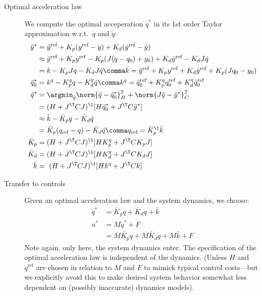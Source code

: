 \documentclass[10pt,fleqn,twoside]{article}
\newcommand{\rf}{{\text{ref}}}
\begin{document}
{{\begin{description}
\item[Optimal acceleration law] We compute the optimal acceperation
  $\ddot q^*$ in its 1st order Taylor approximation w.r.t.\ $q$ and
  $\dot q$:
\begin{align}
\ddot y^*
 &= \ddot y^\rf + K_p(y^\rf-y) + K_d (\dot y^\rf -\dot y) \\
 &\approx \ddot y^\rf + K_p y^\rf - K_p (J(q-q_0)+y_0) + K_d \dot y^\rf - K_d J \dot q \\
 &= k - K_p J q - K_d J \dot q \comma k = \ddot y^\rf + K_p y^\rf+ K_d \dot y^\rf + K_p (J q_0 - y_0) \\
\ddot q_0^*
 &= k^q - K^q_p q - K^q_d \dot q
\comma k^q = \ddot q_0^\rf + K^q_p q_0^\rf+ K^q_d \dot q_0^\rf \\
\ddot q^*
 &= \argmin_{\ddot q} \norm{\ddot q - \ddot q_0^*}^2_H + \norm{J \ddot q - \ddot y^*}^2_C \\
 &= (H + J^\T C J)^\1 [H \ddot q_0^* + J^\T C \ddot y^*] \\
 &\approx
 \bar k - \bar K_p q - \bar K_d \dot q \\
 &= \bar K_p (q_\rf - q) - \bar K_d \dot q \comma q_\rf = \bar K_p^\1 \bar k  \label{eqProjGains}\\
\bar K_p
 &= (H + J^\T C J)^\1 [H K^q_p + J^\T C K_p J] \\
\bar K_d
 &= (H + J^\T C J)^\1 [H K^q_d + J^\T C K_d J] \\
\bar k
 &= ~ (H + J^\T C J)^\1 [H k^q + J^\T C k]
\end{align}


\item[Transfer to controls] Given an optimal acceleration law and the
  system dynamics, we choose:
\begin{align}
\ddot q^*
 &= \bar K_p q + \bar K_d \dot q + \bar k \\
u^*
 &= M \ddot q^* + F \\
 &= M \bar K_p q + M \bar K_d \dot q + M \bar k + F
\end{align}
Note again, only here, the system dynamics enter. The specification of
the optimal acceleration law is independent of the dynamics. (Unless
$H$ and $\ddot q^\rf$ are chosen in relation to $M$ and $F$ to mimick
typical control costs---but we explicitly avoid this to make desired
system behavior somewhat less dependent on (possibly inaccurate)
dynamics models).



\end{description}}}
\end{document}
